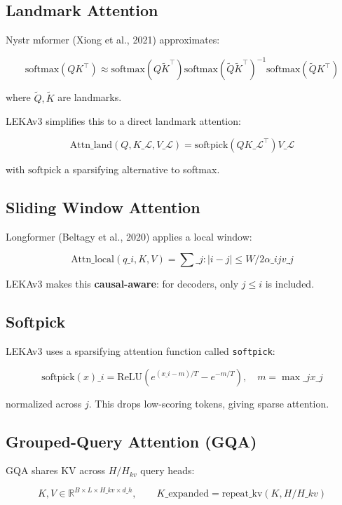 \subsection{Landmark Attention}

Nystr mformer (Xiong et al., 2021) approximates:

\[
\text{softmax}(QK^\top) \approx \text{softmax}(Q \tilde{K}^\top) \text{softmax}(\tilde{Q} \tilde{K}^\top)^{-1} \text{softmax}(\tilde{Q} K^\top)
\tag{3.6}
\]

where $\tilde{Q}, \tilde{K}$ are landmarks.

LEKAv3 simplifies this to a direct landmark attention:

\[
\text{Attn}\_\text{land}(Q, K\_\mathcal{L}, V\_\mathcal{L}) = \text{softpick}(Q K\_\mathcal{L}^\top) V\_\mathcal{L}
\tag{3.7}
\]

with $\text{softpick}$ a sparsifying alternative to softmax.

\subsection{Sliding Window Attention}

Longformer (Beltagy et al., 2020) applies a local window:

\[
\text{Attn}\_\text{local}(q\_i, K, V) = \sum\_{j: |i - j| \leq W/2} \alpha\_{ij} v\_j
\tag{3.8}
\]

LEKAv3 makes this \textbf{causal-aware}: for decoders, only $j \leq i$ is included.

\subsection{Softpick}

LEKAv3 uses a sparsifying attention function called \texttt{softpick}:

\[
\text{softpick}(x)\_i = \text{ReLU}\!\left(e^{(x\_i - m)/T} - e^{-m/T}\right), \quad m = \max\_j x\_j
\tag{3.9}
\]

normalized across $j$. This drops low-scoring tokens, giving sparse attention.

\subsection{Grouped-Query Attention (GQA)}

GQA shares KV across $H/H_{kv}$ query heads:

\[
K, V \in \mathbb{R}^{B \times L \times H\_{kv} \times d\_h}, \qquad
K\_{\text{expanded}} = \text{repeat\_kv}(K, H/H\_{kv})
\tag{3.10}
\]

